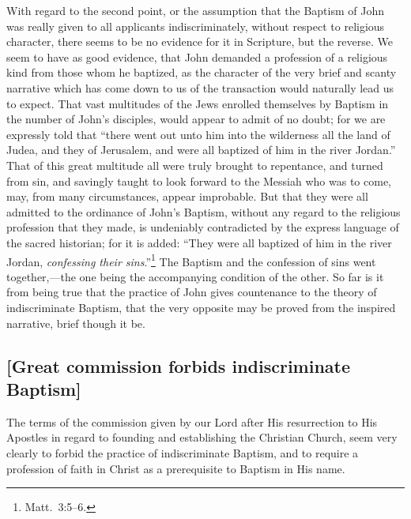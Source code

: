 \documentclass[
]{book}
\begin{document}
With regard to the second point, or the assumption that the Baptism of John was really given to all applicants indiscriminately, without respect to religious character, there seems to be no evidence for it in Scripture, but the reverse. We seem to have as good evidence, that John demanded a profession of a religious kind from those whom he baptized, as the character of the very brief and scanty narrative which has come down to us of the transaction would naturally lead us to expect. That vast multitudes of the Jews enrolled themselves by Baptism in the number of John's disciples, would appear to admit of no doubt; for we are expressly told that ``there went out unto him into the wilderness all the land of Judea, and they of Jerusalem, and were all baptized of him in the river Jordan.'' That of this great multitude all were truly brought to repentance, and turned from sin, and savingly taught to look forward to the Messiah who was to come, may, from many circumstances, appear improbable. But that they were all admitted to the ordinance of John's Baptism, without any regard to the religious profession that they made, is undeniably contradicted by the express language of the sacred historian; for it is added: ``They were all baptized of him in the river Jordan, \emph{confessing their sins}.''\footnote{Matt.~3:5--6.} The Baptism and the confession of sins went together,---the one being the accompanying condition of the other. So far is it from being true that the practice of John gives countenance to the theory of indiscriminate Baptism, that the very opposite may be proved from the inspired narrative, brief though it be.

\hypertarget{great-commission-forbids-indiscriminate-baptism}{%
\subsection{{[}Great commission forbids indiscriminate Baptism{]}}\label{great-commission-forbids-indiscriminate-baptism}}

The terms of the commission given by our Lord after His resurrection to His Apostles in regard to founding and establishing the Christian Church, seem very clearly to forbid the practice of indiscriminate Baptism, and to require a profession of faith in Christ as a prerequisite to Baptism in His name.
\end{document}
